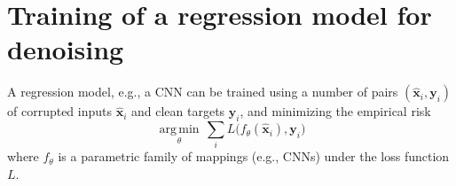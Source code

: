 \section{Training of a regression model for denoising} %
A regression model, e.g., a \gls{CNN} can be trained using a number of pairs $(\hat{{\mathbf x}}_i, {\mathbf y}_i)$ of corrupted inputs $\hat{{\mathbf x}}_i$ and clean targets ${\mathbf y}_i$, and minimizing the empirical risk
\begin{equation}
  \underset{\theta}{\operatorname{arg\,min}} \, \sum_i L \big(f_\theta(\hat{\mathbf x}_i), {\mathbf y}_i\big)
  \label{eq:supervised_learning}
\end{equation}
where $f_\theta$ is a parametric family of mappings (e.g., CNNs) under the loss function $L$.

